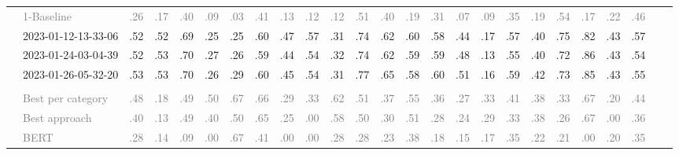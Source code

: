 \begin{table*}
\begin{tabular}{@{}ll@{\hspace{10pt}}c@{\hspace{5pt}}cccccccccccccccccccccc@{}}
& \textcolor{gray}{1-Baseline} & \textcolor{gray}{.26} & \textcolor{gray}{.17} & \textcolor{gray}{.40} & \textcolor{gray}{.09} & \textcolor{gray}{.03} & \textcolor{gray}{.41} & \textcolor{gray}{.13} & \textcolor{gray}{.12} & \textcolor{gray}{.12} & \textcolor{gray}{.51} & \textcolor{gray}{.40} & \textcolor{gray}{.19} & \textcolor{gray}{.31} & \textcolor{gray}{.07} & \textcolor{gray}{.09} & \textcolor{gray}{.35} & \textcolor{gray}{.19} & \textcolor{gray}{.54} & \textcolor{gray}{.17} & \textcolor{gray}{.22} & \textcolor{gray}{.46} \\
& 2023-01-12-13-33-06 & .52 & .52 & .69 & .25 & .25 & .60 & .47 & .57 & .31 & .74 & .62 & .60 & .58 & .44 & .17 & .57 & .40 & .75 & .82 & .43 & .57 \\
& 2023-01-24-03-04-39 & .52 & .53 & .70 & .27 & .26 & .59 & .44 & .54 & .32 & .74 & .62 & .59 & .59 & .48 & .13 & .55 & .40 & .72 & .86 & .43 & .54 \\
& 2023-01-26-05-32-20 & .53 & .53 & .70 & .26 & .29 & .60 & .45 & .54 & .31 & .77 & .65 & .58 & .60 & .51 & .16 & .59 & .42 & .73 & .85 & .43 & .55 \\
\addlinespace
\multicolumn{2}{@{}l}{\emph{Nahj al-Balagha}} \\
& \textcolor{gray}{Best per category} & \textcolor{gray}{.48} & \textcolor{gray}{.18} & \textcolor{gray}{.49} & \textcolor{gray}{.50} & \textcolor{gray}{.67} & \textcolor{gray}{.66} & \textcolor{gray}{.29} & \textcolor{gray}{.33} & \textcolor{gray}{.62} & \textcolor{gray}{.51} & \textcolor{gray}{.37} & \textcolor{gray}{.55} & \textcolor{gray}{.36} & \textcolor{gray}{.27} & \textcolor{gray}{.33} & \textcolor{gray}{.41} & \textcolor{gray}{.38} & \textcolor{gray}{.33} & \textcolor{gray}{.67} & \textcolor{gray}{.20} & \textcolor{gray}{.44} \\
& \textcolor{gray}{Best approach} & \textcolor{gray}{.40} & \textcolor{gray}{.13} & \textcolor{gray}{.49} & \textcolor{gray}{.40} & \textcolor{gray}{.50} & \textcolor{gray}{.65} & \textcolor{gray}{.25} & \textcolor{gray}{.00} & \textcolor{gray}{.58} & \textcolor{gray}{.50} & \textcolor{gray}{.30} & \textcolor{gray}{.51} & \textcolor{gray}{.28} & \textcolor{gray}{.24} & \textcolor{gray}{.29} & \textcolor{gray}{.33} & \textcolor{gray}{.38} & \textcolor{gray}{.26} & \textcolor{gray}{.67} & \textcolor{gray}{.00} & \textcolor{gray}{.36} \\
& \textcolor{gray}{BERT} & \textcolor{gray}{.28} & \textcolor{gray}{.14} & \textcolor{gray}{.09} & \textcolor{gray}{.00} & \textcolor{gray}{.67} & \textcolor{gray}{.41} & \textcolor{gray}{.00} & \textcolor{gray}{.00} & \textcolor{gray}{.28} & \textcolor{gray}{.28} & \textcolor{gray}{.23} & \textcolor{gray}{.38} & \textcolor{gray}{.18} & \textcolor{gray}{.15} & \textcolor{gray}{.17} & \textcolor{gray}{.35} & \textcolor{gray}{.22} & \textcolor{gray}{.21} & \textcolor{gray}{.00} & \textcolor{gray}{.20} & \textcolor{gray}{.35} \\

\end{tabular}
\end{table*}

